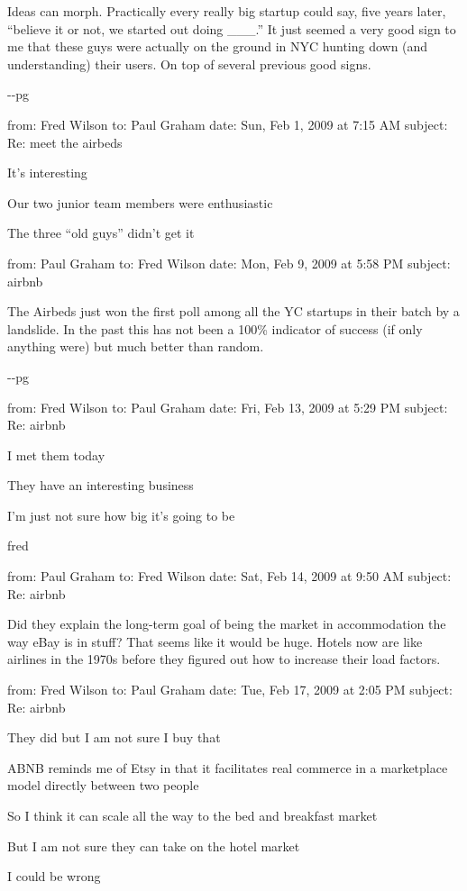 Ideas can morph. Practically every really big startup could say, five
years later, ``believe it or not, we started out doing \_\_\_.'' It just
seemed a very good sign to me that these guys were actually on the
ground in NYC hunting down (and understanding) their users. On top of
several previous good signs.

-\/-pg

from: Fred Wilson to: Paul Graham date: Sun, Feb 1, 2009 at 7:15 AM
subject: Re: meet the airbeds

It's interesting

Our two junior team members were enthusiastic

The three ``old guys'' didn't get it

from: Paul Graham to: Fred Wilson date: Mon, Feb 9, 2009 at 5:58 PM
subject: airbnb

The Airbeds just won the first poll among all the YC startups in their
batch by a landslide. In the past this has not been a 100\% indicator of
success (if only anything were) but much better than random.

-\/-pg

from: Fred Wilson to: Paul Graham date: Fri, Feb 13, 2009 at 5:29 PM
subject: Re: airbnb

I met them today

They have an interesting business

I'm just not sure how big it's going to be

fred

from: Paul Graham to: Fred Wilson date: Sat, Feb 14, 2009 at 9:50 AM
subject: Re: airbnb

Did they explain the long-term goal of being the market in accommodation
the way eBay is in stuff? That seems like it would be huge. Hotels now
are like airlines in the 1970s before they figured out how to increase
their load factors.

from: Fred Wilson to: Paul Graham date: Tue, Feb 17, 2009 at 2:05 PM
subject: Re: airbnb

They did but I am not sure I buy that

ABNB reminds me of Etsy in that it facilitates real commerce in a
marketplace model directly between two people

So I think it can scale all the way to the bed and breakfast market

But I am not sure they can take on the hotel market

I could be wrong

